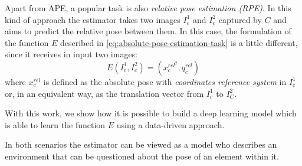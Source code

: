 Apart from APE, a popular task is also \emph{relative pose estimation (RPE)}. In this kind of approach the estimator takes two images $I_c^1$ and $I_c^2$ captured by $C$ and aims to predict the relative pose between them. In this case, the formulation of the function $E$ described in \cref{eq:absolute-pose-estimation-task} is a little different, since it receives in input two images:
\begin{equation}
    E(I_c^1, I_c^2) = (x_c^{rel^2}, q_c^{rel})
    \label{eq:relative-pose-estimation-task}
\end{equation}
where $x_c^{rel}$ is defined as the absolute pose with \emph{coordinates reference system} in $I_c^1$ or, in an equivalent way, as the translation vector from $I_c^1$ to $I_C^2$.

With this work, we show how it is possible to build a deep learning model which is able to learn the function $E$ using a data-driven approach.

In both scenarios the estimator can be viewed as a model who describes an environment that can be questioned about the pose of an element within it.
